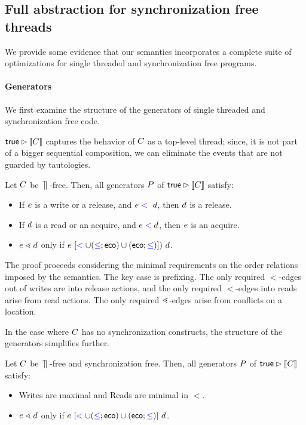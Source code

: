 \subsection{Full abstraction for synchronization free threads}
We provide some evidence that our semantics incorporates a complete suite of optimizations for single threaded and synchronization free programs.

\paragraph*{Generators}
We first examine the structure of the generators of single threaded and synchronization free code.  

$\mathsf{true}\mathbin\rhd \llbracket C\rrbracket$ captures the behavior of $C$ as a top-level thread; since, it is not part of a bigger sequential composition, we can eliminate the events that are not guarded by tautologies.
\begin{lemma}
Let $C$ be $\,\mathbin{\rrceil}\,$-free.  Then, all generators $P$ of $\mathsf{true}\mathbin\rhd \llbracket C\rrbracket$ satisfy:
\begin{itemize}
\item If $e$ is a write or a release, and $e \mathrel{{\color{blue}<}}\ d$, then $d$ is a release.
\item If $d$ is a read or an acquire, and $e \mathrel{{\color{blue}<}} d$, then $e$ is an acquire.
\item $e \lessdot d$ only if $ e\ [\mathrel{{\color{blue}<}} \cup (\mathrel{{\color{blue}\leq}};\mathrel{\mathsf{eco}}) \cup (\mathrel{\mathsf{eco}};\mathrel{{\color{blue}\leq}})]) \  d$.
\end{itemize}
\end{lemma}
The proof proceeds considering the minimal requirements on the order relations imposed by the semantics.  The key case is prefixing.  The only required $\lt$-edges out of writes are into release actions, and the only required $\lt$-edges into reads arise from read actions.  The only required $\lessdot$-edges arise from conflicts on a location.

In the case where $C$ has no synchronization constructs, the structure of the generators simplifies further.
\begin{corollary}
Let $C$ be $\,\mathbin{\rrceil}\,$-free and synchronization free.  Then, all generators $P$ of $\mathsf{true}\mathbin\rhd \llbracket C\rrbracket$ satisfy:
\begin{itemize}
\item Writes are maximal and Reads are minimal in $\lt$.
\item $e \lessdot d$ only if $ e\ [\mathrel{{\color{blue}<}} \cup (\mathrel{{\color{blue}\leq}}; \mathrel{\mathsf{eco}}) \cup (\mathrel{\mathsf{eco}};\mathrel{{\color{blue}\leq}})] \  d$.
\end{itemize}
\end{corollary}

